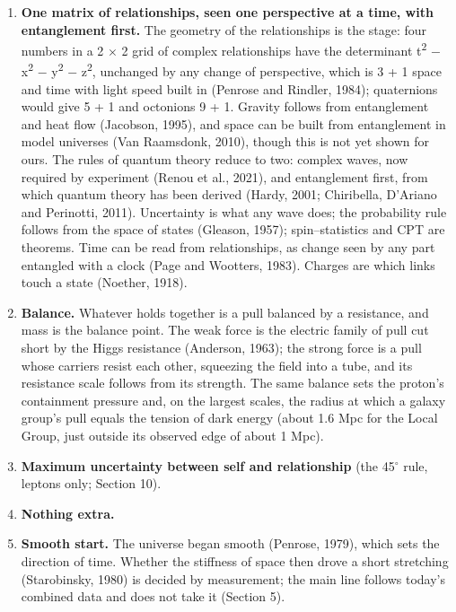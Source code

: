 \documentclass[
  11pt,
]{article}
\providecommand{\tightlist}{%
  \setlength{\itemsep}{0pt}\setlength{\parskip}{0pt}}
\begin{document}
\begin{enumerate}
\def\labelenumi{\arabic{enumi}.}
\tightlist
\item
  \textbf{One matrix of relationships, seen one perspective at a time, with entanglement first.} The geometry of the relationships is the stage: four numbers in a 2 \ensuremath{\times} 2 grid of complex relationships have the determinant t\textsuperscript{2} \ensuremath{-} x\textsuperscript{2} \ensuremath{-} y\textsuperscript{2} \ensuremath{-} z\textsuperscript{2}, unchanged by any change of perspective, which is 3 + 1 space and time with light speed built in (Penrose and Rindler, 1984); quaternions would give 5 + 1 and octonions 9 + 1. Gravity follows from entanglement and heat flow (Jacobson, 1995), and space can be built from entanglement in model universes (Van Raamsdonk, 2010), though this is not yet shown for ours. The rules of quantum theory reduce to two: complex waves, now required by experiment (Renou et al., 2021), and entanglement first, from which quantum theory has been derived (Hardy, 2001; Chiribella, D'Ariano and Perinotti, 2011). Uncertainty is what any wave does; the probability rule follows from the space of states (Gleason, 1957); spin--statistics and CPT are theorems. Time can be read from relationships, as change seen by any part entangled with a clock (Page and Wootters, 1983). Charges are which links touch a state (Noether, 1918).
\item
  \textbf{Balance.} Whatever holds together is a pull balanced by a resistance, and mass is the balance point. The weak force is the electric family of pull cut short by the Higgs resistance (Anderson, 1963); the strong force is a pull whose carriers resist each other, squeezing the field into a tube, and its resistance scale follows from its strength. The same balance sets the proton's containment pressure and, on the largest scales, the radius at which a galaxy group's pull equals the tension of dark energy (about 1.6 Mpc for the Local Group, just outside its observed edge of about 1 Mpc).
\item
  \textbf{Maximum uncertainty between self and relationship} (the 45\ensuremath{^\circ} rule, leptons only; Section 10).
\item
  \textbf{Nothing extra.}
\item
  \textbf{Smooth start.} The universe began smooth (Penrose, 1979), which sets the direction of time. Whether the stiffness of space then drove a short stretching (Starobinsky, 1980) is decided by measurement; the main line follows today's combined data and does not take it (Section 5).
\end{enumerate}
\end{document}
